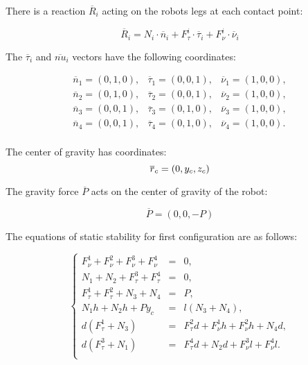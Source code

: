 \documentclass{ws-procs9x6}
\begin{document}
There is a reaction $\overline{R}_i$ acting on the robots legs at each contact point:

\begin{equation}
\overline{R}_i =  N_i\cdot\overline{n}_i+F^i_\tau\cdot\overline{\tau}_i+F^i_\nu\cdot\overline{\nu}_i
\end{equation}

The $\overline{\tau}_i$ and $\overline{nu}_i$ vectors have the following coordinates:

\begin{equation}
\begin{array}{ccc}
  \overline{n}_1 = (0,1,0), & \overline{\tau}_1 = (0,0,1),& \overline{\nu}_1 = (1,0,0),\\
  \overline{n}_2 = (0,1,0), & \overline{\tau}_2 = (0,0,1),& \overline{\nu}_2 = (1,0,0),\\
  \overline{n}_3 = (0,0,1), & \overline{\tau}_3 = (0,1,0),& \overline{\nu}_3 = (1,0,0),\\
  \overline{n}_4 = (0,0,1), & \overline{\tau}_4 = (0,1,0),& \overline{\nu}_4 = (1,0,0).\\
\end{array}
\end{equation}

The center of gravity has coordinates:
\begin{equation}
  \overline{r}_c = (0,y_c,z_c)\\
\end{equation}

The gravity force $\overline{P}$ acts on the center of gravity of the robot:

\begin{equation}
\overline{P} = (0,0,-P)
\end{equation}

The equations of static stability for first configuration are as follows:

\begin{equation}
\label{eq:case1_initial}
\left\{
  \begin{array}{rcl}
    F_\nu^1 + F_\nu^2 + F_\nu^3 + F_\nu^4 &=& 0, \\
    N_1 + N_2 + F_\tau^3 + F_\tau^4 &=& 0, \\
    F_\tau^1 + F_\tau^2 + N_3 + N_4 &=& P, \\
    N_1h + N_2h + Py_c &=& l(N_3 + N_4), \\
    d(F_\tau^1 + N_3) &=& F_\tau^2d + F_\nu^1h + F_\nu^2h + N_4d, \\
    d(F_\tau^3 + N_1) &=& F_\tau^4d + N_2d +F_\nu^3l + F_\nu^4l.\\
  \end{array}
\right.
\end{equation}
\end{document}
